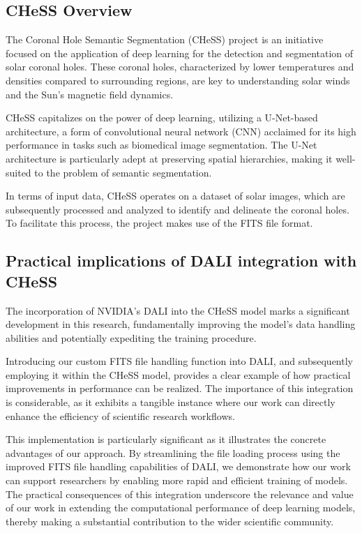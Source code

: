 \documentclass[licencjacka,en]{pracamgr}
\begin{document}
\subsection{CHeSS Overview}
The Coronal Hole Semantic Segmentation (CHeSS) project \cite{CHeSS} is an initiative focused on the application of deep learning for the detection and segmentation of solar coronal holes. These coronal holes, characterized by lower temperatures and densities compared to surrounding regions, are key to understanding solar winds and the Sun’s magnetic field dynamics.

CHeSS capitalizes on the power of deep learning, utilizing a U-Net-based architecture, a form of convolutional neural network (CNN) acclaimed for its high performance in tasks such as biomedical image segmentation. The U-Net architecture is particularly adept at preserving spatial hierarchies, making it well-suited to the problem of semantic segmentation.

In terms of input data, CHeSS operates on a dataset of solar images, which are subsequently processed and analyzed to identify and delineate the coronal holes. To facilitate this process, the project makes use of the FITS file format. 

\subsection{Practical implications of DALI integration with CHeSS}

The incorporation of NVIDIA's DALI into the CHeSS model marks a significant development in this research, fundamentally improving the model's data handling abilities and potentially expediting the training procedure.

Introducing our custom FITS file handling function into DALI, and subsequently employing it within the CHeSS model, provides a clear example of how practical improvements in performance can be realized. The importance of this integration is considerable, as it exhibits a tangible instance where our work can directly enhance the efficiency of scientific research workflows.

This implementation is particularly significant as it illustrates the concrete advantages of our approach. By streamlining the file loading process using the improved FITS file handling capabilities of DALI, we demonstrate how our work can support researchers by enabling more rapid and efficient training of models. The practical consequences of this integration underscore the relevance and value of our work in extending the computational performance of deep learning models, thereby making a substantial contribution to the wider scientific community.
\end{document}
